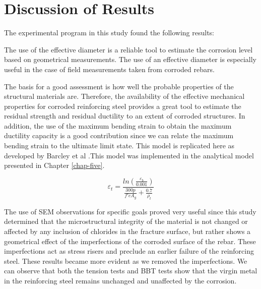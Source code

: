 \section{Discussion of Results}

The experimental program in this study found the following results:

The use of the effective diameter is a reliable tool to estimate the corrosion level based on geometrical measurements. The use of an effective diameter is especially useful in the case of field measurements taken from corroded rebars. 

The basis for a good assessment is how well the probable properties of the structural materials are. Therefore, the availability of the effective mechanical properties for corroded reinforcing steel provides a great tool to estimate the residual strength and residual ductility to an extent of corroded structures. In addition, the use of the maximum bending strain to obtain the maximum ductility capacity is a good contribution since we can relate the maximum bending strain to the ultimate limit state. This model is replicated here as  developed by Barcley et al \cite{Barcley2019}.This model was implemented in the analytical model presented in Chapter \ref{chap-five}. 

\begin{equation}
    \varepsilon_{t}=\frac{ln(\frac{\varepsilon_{b}}{0.001})}{\frac{300p}{f'c A_{g}}+\frac{0.7}{\rho_{t}}}
    \label{eq.BarFracture}
\end{equation}

The use of SEM observations for specific goals proved very useful since this study determined that the microstructural integrity of the material is not changed or affected by any inclusion of chlorides in the fracture surface, but rather shows a geometrical effect of the imperfections of the corroded surface of the rebar. These imperfections act as stress risers and preclude an earlier failure of the reinforcing steel. These results became more evident as we removed the imperfections. We can observe that both the tension tests and BBT tests show that the virgin metal in the reinforcing steel remains unchanged and unaffected by the corrosion.




